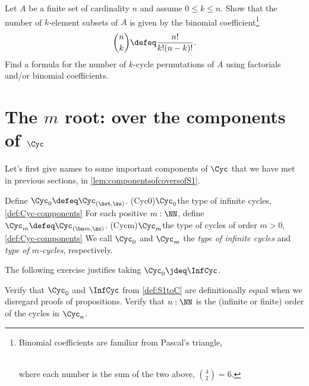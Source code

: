 \begin{xca}
  Let $A$ be a finite set of cardinality $n$ and assume $0\le k \le n$.
  Show that the number of $k$-element subsets of $A$ is given by the
  binomial coefficient\footnote{%
    Binomial coefficients are familiar from Pascal's triangle,\\
    \\
    \noindent where each number is the sum of the two above, \eg $\binom42 = 6$.}
  \[
    \binom nk \defeq \frac{n!}{k!(n-k)!}.
  \]
  Find a formula for the number of $k$-cycle permutations of $A$
  using factorials and/or binomial coefficients.
\end{xca}

\section{The \texorpdfstring{$m$\th}{mᵗʰ} root:
  \coverings over the components of $\Cyc$}

Let's first give names to some important components of $\Cyc$ that
we have met in previous sections, \eg in \cref{lem:componentsofcoversofS1}.

\begin{definition}\label{def:Cyc-components}
Define $\Cyc_0 \defeq \Cyc_{(\zet,\zs)}$.
\glossary(Cyc0){$\protect\Cyc_0$}{the type of infinite cycles,
\cref{def:Cyc-components}} 
For each positive $m:\NN$, define $\Cyc_m \defeq \Cyc_{(\bn m,\zs)}$.
\glossary(Cycm){$\protect\Cyc_m$}{the type of cycles of order $m>0$,
\cref{def:Cyc-components}} 
We call $\Cyc_0$ and $\Cyc_m$ the \emph{type of infinite cycles}
and \emph{type of $m$-cycles}, respectively.
\end{definition}
The following exercise justifies taking $\Cyc_0\jdeq\InfCyc$.
\begin{xca}\label{xca:Cyc-components}
Verify that $\Cyc_0$ and $\InfCyc$ from \cref{def:S1toC}
are definitionally equal when we disregard proofs of propositions.
Verify that $n:\NN$ is the (infinite or finite) order of the cycles in $\Cyc_n$. 
\end{xca} 


